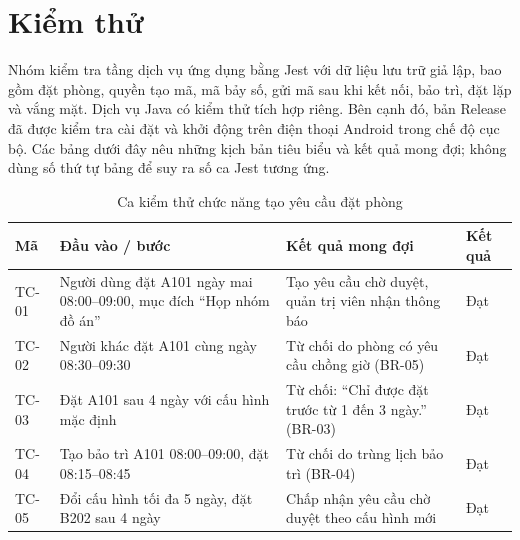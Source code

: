 \documentclass[../DoAn.tex]{subfiles}
\begin{document}
\section{Kiểm thử}
Nhóm kiểm tra tầng dịch vụ ứng dụng bằng Jest với dữ liệu lưu trữ giả lập, bao gồm đặt phòng, quyền tạo mã, mã bảy số, gửi mã sau khi kết nối, bảo trì, đặt lặp và vắng mặt. Dịch vụ Java có kiểm thử tích hợp riêng. Bên cạnh đó, bản Release đã được kiểm tra cài đặt và khởi động trên điện thoại Android trong chế độ cục bộ. Các bảng dưới đây nêu những kịch bản tiêu biểu và kết quả mong đợi; không dùng số thứ tự bảng để suy ra số ca Jest tương ứng.

\begin{table}[H]
\centering\small
\renewcommand{\arraystretch}{1.15}
\caption{Ca kiểm thử chức năng tạo yêu cầu đặt phòng}
\label{tab:tc_booking}
\begin{tabularx}{\textwidth}{|p{1.2cm}|X|X|p{1.3cm}|}
\hline
\textbf{Mã} & \textbf{Đầu vào / bước} & \textbf{Kết quả mong đợi} & \textbf{Kết quả} \\ \hline
TC-01 & Người dùng đặt A101 ngày mai 08:00--09:00, mục đích ``Họp nhóm đồ án'' & Tạo yêu cầu chờ duyệt, quản trị viên nhận thông báo & Đạt \\ \hline
TC-02 & Người khác đặt A101 cùng ngày 08:30--09:30 & Từ chối do phòng có yêu cầu chồng giờ (BR-05) & Đạt \\ \hline
TC-03 & Đặt A101 sau 4 ngày với cấu hình mặc định & Từ chối: ``Chỉ được đặt trước từ 1 đến 3 ngày.'' (BR-03) & Đạt \\ \hline
TC-04 & Tạo bảo trì A101 08:00--09:00, đặt 08:15--08:45 & Từ chối do trùng lịch bảo trì (BR-04) & Đạt \\ \hline
TC-05 & Đổi cấu hình tối đa 5 ngày, đặt B202 sau 4 ngày & Chấp nhận yêu cầu chờ duyệt theo cấu hình mới & Đạt \\ \hline
\end{tabularx}
\end{table}
\end{document}
